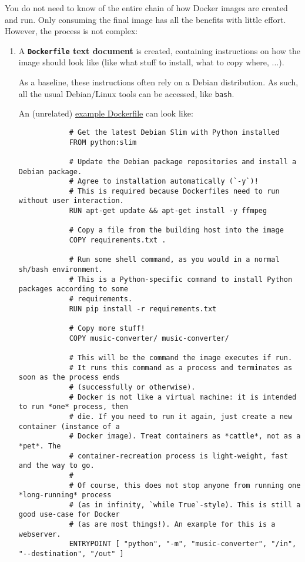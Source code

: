 You do not need to know of the entire chain of how Docker images are created and run.
Only consuming the final image has all the benefits with little effort.
However, the process is not complex:
\begin{enumerate}
    \item A \textbf{\texttt{Dockerfile} text document} is created, containing instructions on how the image should look like (like what stuff to install, what to copy where, ...).

        As a baseline, these instructions often rely on a Debian distribution.
        As such, all the usual Debian/Linux tools can be accessed, like \texttt{bash}.

        An (unrelated)
        \href{https://github.com/alexpovel/random_python/blob/master/music-converter/Dockerfile}{example Dockerfile}
        can look like:

        \begin{verbatim}
            # Get the latest Debian Slim with Python installed
            FROM python:slim

            # Update the Debian package repositories and install a Debian package.
            # Agree to installation automatically (`-y`)!
            # This is required because Dockerfiles need to run without user interaction.
            RUN apt-get update && apt-get install -y ffmpeg

            # Copy a file from the building host into the image
            COPY requirements.txt .

            # Run some shell command, as you would in a normal sh/bash environment.
            # This is a Python-specific command to install Python packages according to some
            # requirements.
            RUN pip install -r requirements.txt

            # Copy more stuff!
            COPY music-converter/ music-converter/

            # This will be the command the image executes if run.
            # It runs this command as a process and terminates as soon as the process ends
            # (successfully or otherwise).
            # Docker is not like a virtual machine: it is intended to run *one* process, then
            # die. If you need to run it again, just create a new container (instance of a
            # Docker image). Treat containers as *cattle*, not as a *pet*. The
            # container-recreation process is light-weight, fast and the way to go.
            #
            # Of course, this does not stop anyone from running one *long-running* process
            # (as in infinity, `while True`-style). This is still a good use-case for Docker
            # (as are most things!). An example for this is a webserver.
            ENTRYPOINT [ "python", "-m", "music-converter", "/in", "--destination", "/out" ]
        \end{verbatim}


\end{enumerate}
